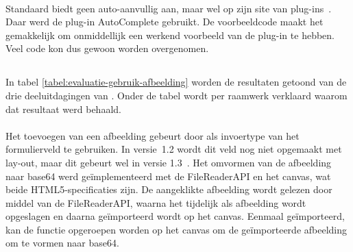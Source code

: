 \paragraph{\lungo}
Standaard biedt \lungo{} geen auto-aanvullig aan, maar wel op zijn site van plug-ins~\cite{TapQuo2013b}.
Daar werd de plug-in AutoComplete gebruikt.
De voorbeeldcode maakt het gemakkelijk om onmiddellijk een werkend voorbeeld van de plug-in te hebben.
Veel code kon dus gewoon worden overgenomen.


\subsection{}
\label{sec:evaluatie-gebruik-afbeelding}

In tabel \ref{tabel:evaluatie-gebruik-afbeelding} worden de resultaten getoond van de drie deeluitdagingen van .
Onder de tabel wordt per raamwerk verklaard waarom dat resultaat werd behaald.

\begin{table}[H]
\centering
{}
\caption{Gebruik voor }
\label{tabel:evaluatie-gebruik-afbeelding}
\end{table}

\paragraph{\jqm}
Het toevoegen van een afbeelding gebeurt door  als invoertype van het formulierveld te gebruiken. 
In versie~1.2 wordt dit veld nog niet opgemaakt met lay-out, maar dit gebeurt wel in versie 1.3~\cite{JQuery2013d}. 
Het omvormen van de afbeelding naar base64 werd geïmplementeerd met de FileReaderAPI en het canvas, wat beide HTML5-specificaties zijn. 
De aangeklikte afbeelding wordt gelezen door middel van de FileReaderAPI, waarna het tijdelijk als afbeelding wordt opgeslagen en daarna geïmporteerd wordt op het canvas. 
Eenmaal geïmporteerd, kan de functie  opgeroepen worden op het canvas om de geïmporteerde afbeelding om te vormen naar base64. 

